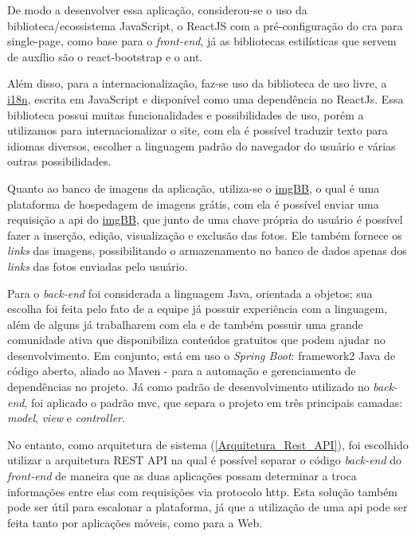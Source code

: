 De modo a desenvolver essa aplicação, considerou-se o uso da biblioteca/ecossistema JavaScript, o ReactJS com a pré-configuração do \gls{cra} para \gls{single-page}, como base para o \textsl{\gls{front-end}}, já as bibliotecas estilísticas que servem de auxílio são o \gls{react-bootstrap} e o \gls{ant}.

Além disso, para a internacionalização, faz-se uso da biblioteca de uso livre, a  \href{https://www.i18next.com}{i18n}, escrita em JavaScript e disponível como uma dependência no ReactJs. Essa biblioteca possui muitas funcionalidades e possibilidades de uso, porém a utilizamos para internacionalizar o site, com ela é possível traduzir texto para idiomas diversos, escolher a linguagem padrão do navegador do usuário e várias outras possibilidades.

Quanto ao banco de imagens da aplicação, utiliza-se o \href{https://pt-br.imgbb.com}{imgBB}, o qual é uma plataforma de hospedagem de imagens grátis, com ela é possível enviar uma requisição a \acs{api} do \href{https://pt-br.imgbb.com}{imgBB}, que junto de uma chave própria do usuário é possível fazer a inserção, edição, visualização e exclusão das fotos. Ele também fornece os \textsl{links} das imagens, possibilitando o armazenamento no banco de dados apenas dos \textsl{links} das fotos enviadas pelo usuário.

Para o \textsl{\gls{back-end}} foi considerada a linguagem Java, orientada a objetos; sua escolha foi feita pelo fato de a equipe já possuir experiência com a linguagem, além de alguns já trabalharem com ela e de também possuir uma grande comunidade ativa que disponibiliza conteúdos gratuitos que podem ajudar no desenvolvimento. Em conjunto, está em uso o \textit{Spring Boot}: \gls{framework2} Java de código aberto, aliado ao \gls{Maven} - para a automação e gerenciamento de dependências no projeto.  Já como padrão de desenvolvimento utilizado no  \textsl{\gls{back-end}}, foi aplicado o padrão \acs{mvc}, que separa o projeto em três principais camadas: \textit{model}, \textit{view} e \textit{controller}.

No entanto, como arquitetura de sistema (\autoref{Arquitetura_Rest_API}), foi escolhido utilizar a arquitetura \gls{REST API} na qual é possível separar o código \textsl{\gls{back-end}} do \textsl{\gls{front-end}} de maneira que as duas aplicações possam determinar a troca informações entre elas com requisições via protocolo \acs{http}. Esta solução também pode ser útil para escalonar a plataforma, já que a utilização de uma \acs{api} pode ser feita tanto por aplicações móveis, como para a Web.

